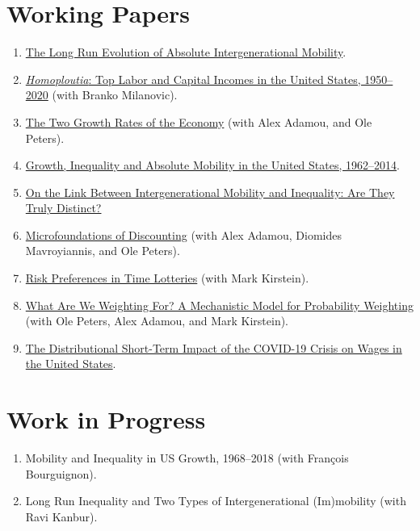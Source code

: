 \documentclass[10pt]{article}
\begin{document}
\section*{Working Papers}
\begin{enumerate}%
\item \href{https://bit.ly/AbsoluteMobility}{The Long Run Evolution of Absolute Intergenerational Mobility}.
\item \href{https://bit.ly/homoploutia1}{\textit{Homoploutia}: Top Labor and Capital Incomes in the United States, 1950--2020} (with Branko Milanovic).
\item \href{https://bit.ly/DDP_WP}{The Two Growth Rates of the Economy} (with Alex Adamou, and Ole Peters).
\item \href{http://bit.ly/2OgeI8A}{Growth, Inequality and Absolute Mobility in the United States, 1962--2014}.
\item \href{http://bit.ly/2JcKCOc}{On the Link Between Intergenerational Mobility and Inequality: Are They Truly Distinct?}
\item \href{http://bit.ly/2AHQ2vZ}{Microfoundations of Discounting} (with Alex Adamou, Diomides Mavroyiannis, and Ole Peters).
\item \href{http://bit.ly/TimeLotteries}{Risk Preferences in Time Lotteries} (with Mark Kirstein).
\item \href{https://arxiv.org/abs/2005.00056}{What Are We Weighting For? A Mechanistic Model for Probability Weighting} (with Ole Peters, Alex Adamou, and Mark Kirstein).
\item \href{https://bit.ly/COVID_WAGES_Berman}{The Distributional Short-Term Impact of the COVID-19 Crisis on Wages in the United States}.
\end{enumerate}

\section*{Work in Progress}
\begin{enumerate}
\item Mobility and Inequality in US Growth, 1968--2018 (with Fran\c{c}ois Bourguignon).
\item Long Run Inequality and Two Types of Intergenerational (Im)mobility (with Ravi Kanbur).
\end{enumerate}
\end{document}
